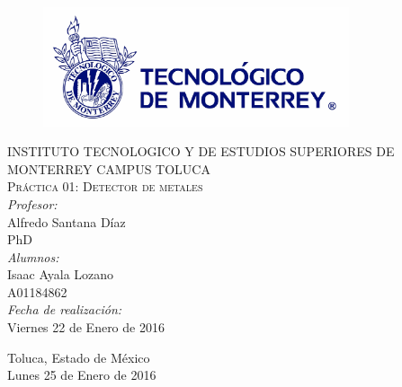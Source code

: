 \begin{titlepage}
\begin{center}
\begin{figure}[!htbp]
\centering
\includegraphics[width=90mm]{./img/logo_itesm.jpg}
\end{figure}


\textsc{ INSTITUTO TECNOLOGICO Y DE ESTUDIOS SUPERIORES DE MONTERREY
CAMPUS TOLUCA}\\[1.5cm]

\textsc{ Pr\'actica 01: Detector de metales}\\[0.5cm]


\emph{Profesor:}\\
 Alfredo Santana D\'iaz\\
 PhD\\
 \medskip
\emph{Alumnos:} \\
Isaac Ayala Lozano\\A01184862\\
 \medskip
\emph{Fecha de realizaci\'on:}\\
Viernes 22 de Enero de 2016\\
\vfill


{\large
Toluca, Estado de M\'exico\\
Lunes 25 de Enero de 2016
}

\end{center}
\end{titlepage}
